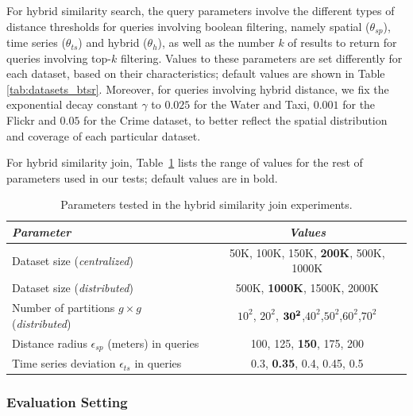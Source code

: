For hybrid similarity search, the query parameters involve the different types of distance thresholds for queries involving boolean filtering, namely spatial ($\theta_{sp}$), time series ($\theta_{ts}$) and hybrid ($\theta_h$), as well as the number $k$ of results to return for queries involving top-$k$ filtering. Values to these parameters are set differently for each dataset, based on their characteristics; default values are shown in Table \ref{tab:datasets_btsr}. Moreover, for queries involving hybrid distance, we fix the exponential decay constant $\gamma$ to $0.025$ for the Water and Taxi, $0.001$ for the Flickr and $0.05$ for the Crime dataset, to better reflect the spatial distribution and coverage of each particular dataset.

For hybrid similarity join, Table~\ref{tab:parameters} lists the range of values for the rest of parameters used in our tests; default values are in bold.

\begin{table}[!ht]
	\centering
	\caption{Parameters tested in the hybrid similarity join experiments.}
	\begin{small}
	\begin{tabular}{lc} 
	\hline
	{\em Parameter} &{\em Values} \\
	\hline
	Dataset size ({\em centralized}) & 50K, 100K, 150K, {\bf 200K}, 500K, 1000K \\
	Dataset size ({\em distributed}) & 500K, {\bf 1000K}, 1500K, 2000K \\
	Number of partitions $g\times g$ ({\em distributed}) & $10^2$, $20^2$, ${\bf 30^2}$,$40^2$,$50^2$,$60^2$,$70^2$ \\
	Distance radius $\epsilon_{sp}$ (meters) in queries & 100, 125, {\bf 150}, 175, 200 \\
	Time series deviation $\epsilon_{ts}$ in queries & 0.3, {\bf 0.35}, 0.4, 0.45, 0.5 \\
	\hline
	\end{tabular}
	\end{small}
	\label{tab:parameters}
\end{table}

\subsubsection{Evaluation Setting}

